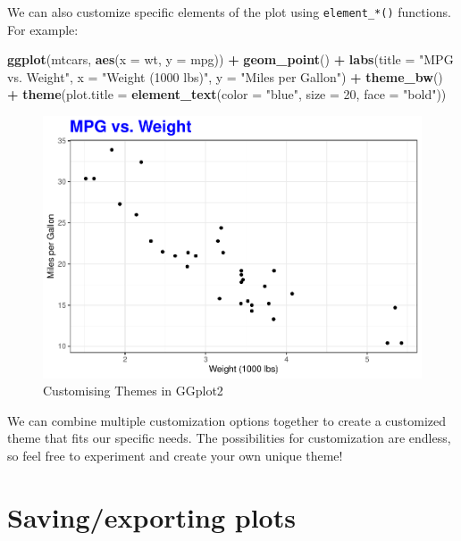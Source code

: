 \documentclass[
]{book}
\newenvironment{Shaded}{\begin{snugshade}}{\end{snugshade}}
\newcommand{\AttributeTok}[1]{\textcolor[rgb]{0.13,0.29,0.53}{#1}}
\newcommand{\DecValTok}[1]{\textcolor[rgb]{0.00,0.00,0.81}{#1}}
\newcommand{\FunctionTok}[1]{\textcolor[rgb]{0.13,0.29,0.53}{\textbf{#1}}}
\newcommand{\NormalTok}[1]{#1}
\newcommand{\SpecialCharTok}[1]{\textcolor[rgb]{0.81,0.36,0.00}{\textbf{#1}}}
\newcommand{\StringTok}[1]{\textcolor[rgb]{0.31,0.60,0.02}{#1}}
\begin{document}
We can also customize specific elements of the plot using \texttt{element\_*()} functions. For example:

\begin{Shaded}
\begin{Highlighting}[]
\FunctionTok{ggplot}\NormalTok{(mtcars, }\FunctionTok{aes}\NormalTok{(}\AttributeTok{x =}\NormalTok{ wt, }\AttributeTok{y =}\NormalTok{ mpg)) }\SpecialCharTok{+}
  \FunctionTok{geom\_point}\NormalTok{() }\SpecialCharTok{+}
  \FunctionTok{labs}\NormalTok{(}\AttributeTok{title =} \StringTok{"MPG vs. Weight"}\NormalTok{,}
       \AttributeTok{x =} \StringTok{"Weight (1000 lbs)"}\NormalTok{,}
       \AttributeTok{y =} \StringTok{"Miles per Gallon"}\NormalTok{) }\SpecialCharTok{+}
  \FunctionTok{theme\_bw}\NormalTok{() }\SpecialCharTok{+}
  \FunctionTok{theme}\NormalTok{(}\AttributeTok{plot.title =} \FunctionTok{element\_text}\NormalTok{(}\AttributeTok{color =} \StringTok{"blue"}\NormalTok{, }\AttributeTok{size =} \DecValTok{20}\NormalTok{, }\AttributeTok{face =} \StringTok{"bold"}\NormalTok{))}
\end{Highlighting}
\end{Shaded}

\begin{figure}

{\centering \includegraphics[width=0.49\linewidth]{DauR_files/figure-latex/theme2-1} 

}

\caption{Customising Themes in GGplot2}\label{fig:theme2}
\end{figure}

We can combine multiple customization options together to create a customized theme that fits our specific needs. The possibilities for customization are endless, so feel free to experiment and create your own unique theme!

\hypertarget{savingexporting-plots}{%
\section{Saving/exporting plots}\label{savingexporting-plots}}
\end{document}
